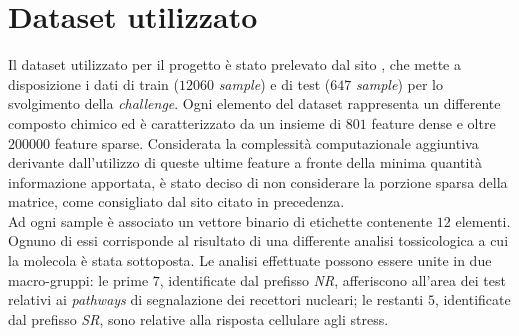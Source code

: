 \section{Dataset utilizzato}
Il dataset utilizzato per il progetto è stato prelevato dal sito \cite{dataset_site}, che mette a disposizione i dati di train ($12060$ \textit{sample}) e di test ($647$ \textit{sample}) per lo svolgimento della \textit{challenge}.
Ogni elemento del dataset rappresenta un differente composto chimico ed è caratterizzato da un insieme di $801$ feature dense e oltre $200000$ feature sparse. Considerata la complessità computazionale aggiuntiva derivante dall'utilizzo di queste ultime feature a fronte della minima quantità informazione apportata, è stato deciso di non considerare la porzione sparsa della matrice, come consigliato dal sito citato in precedenza.\\
Ad ogni sample è associato un vettore binario di etichette contenente $12$ elementi. Ognuno di essi corrisponde al risultato di una differente analisi tossicologica a cui la molecola è stata sottoposta. Le analisi effettuate possono essere unite in due macro-gruppi: le prime $7$, identificate dal prefisso \textit{NR}, afferiscono all'area dei test relativi ai \textit{pathways} di segnalazione dei recettori nucleari; le restanti $5$, identificate dal prefisso \textit{SR}, sono relative alla risposta cellulare agli stress.\\
